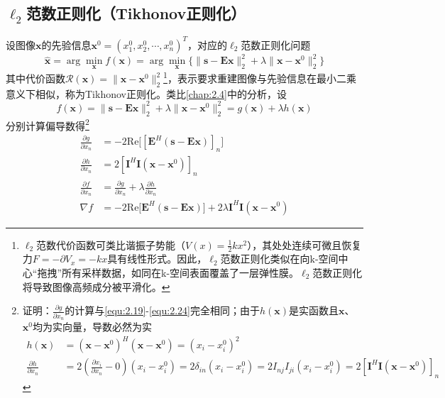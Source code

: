 \documentclass[12pt]{article}
\begin{document}
\subsection{$\ell_2$范数正则化（Tikhonov正则化）}
设图像$\bm{x}$的先验信息$\bm{x}^0=(x^0_1,x^0_2,\cdots,x^0_n)^T$，对应的$\ell_2$范数正则化问题
\begin{equation}
    \hat{\bm{x}}=\arg\min_{\bm{x}}f(\bm{x})=\arg\min_{\bm{x}}\{\|\bm{s}-\mathbf{E}\bm{x}\|_2^2+\lambda\|\bm{x}-\bm{x}^0\|_2^2\}
    \label{equ:2.32}
\end{equation}
其中代价函数$\mathcal{R}(\bm{x})=\|\bm{x}-\bm{x}^0\|_2^2$\footnote{$\ell_2$范数代价函数可类比谐振子势能（$V(x)=\frac{1}{2}k x^2$），其处处连续可微且恢复力$F=-\partial V_x=-kx$具有线性形式。因此，$\ell_2$范数正则化类似在向k-空间中心“拖拽”所有采样数据，如同在k-空间表面覆盖了一层弹性膜。$\ell_2$范数正则化将导致图像高频成分被平滑化。}，表示要求重建图像与先验信息在最小二乘意义下相似，称为Tikhonov正则化。类比\autoref{chap:2.4}中的分析，设
\begin{equation}
    f(\bm{x})=\|\bm{s}-\mathbf{E}\bm{x}\|_2^2+\lambda\|\bm{x}-\bm{x}^0\|_2^2=g(\bm{x})+\lambda h(\bm{x})
\end{equation}
分别计算偏导数得\footnote{证明：$\frac{\partial g}{\partial x_n}$的计算与\autoref{equ:2.19}-\autoref{equ:2.24}完全相同；由于$h(\bm{x})$是实函数且$\bm{x}$、$\bm{x}^0$均为实向量，导数必然为实
\begin{align}
    h(\bm{x})&=(\bm{x}-\bm{x}^0)^H(\bm{x}-\bm{x}^0)=(x_i-x^0_i)^2 \\
    \frac{\partial h}{\partial x_n}&=2\left(\frac{\partial x_i}{\partial x_n}-0\right)(x_i-x^0_i)=2\delta_{in}(x_i-x^0_i)=2I_{nj}I_{ji}(x_i-x^0_i)=2\left[\mathbf{I}^H\mathbf{I}(\bm{x}-\bm{x}^0)\right]_n
\end{align}
}
\begin{align}
    \frac{\partial g}{\partial x_n}&=-2\mathrm{Re}\bigg[\left[\mathbf{E}^H\left(\bm{s}-\mathbf{E}\bm{x}\right)\right]_n\bigg] \\
    \frac{\partial h}{\partial x_n}&=2\left[\mathbf{I}^H\mathbf{I}(\bm{x}-\bm{x}^0)\right]_n \\
    \frac{\partial f}{\partial x_n}&=\frac{\partial g}{\partial x_n}+\lambda\frac{\partial h}{\partial x_n} \\
    \nabla f&=-2\mathrm{Re}\bigg[\mathbf{E}^H\left(\bm{s}-\mathbf{E}\bm{x}\right)\bigg]+2\lambda\mathbf{I}^H\mathbf{I}(\bm{x}-\bm{x}^0)
    \label{equ:2.33}
\end{align}
\end{document}

